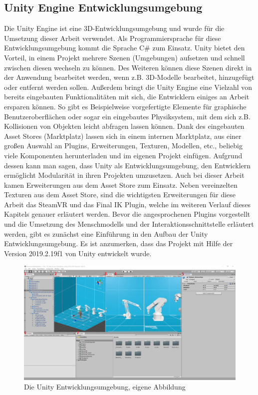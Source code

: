 \subsection{Unity Engine Entwicklungsumgebung}\label{sec:UnitEngine}
Die Unity Engine ist eine 3D-Entwicklungsumgebung und wurde für die Umsetzung dieser Arbeit verwendet. Als Programmiersprache für diese Entwicklungsumgebung kommt die Sprache C\# zum Einsatz. Unity bietet den Vorteil, in einem Projekt mehrere Szenen (Umgebungen) aufsetzen und schnell zwischen diesen wechseln zu können. Des Weiteren können diese Szenen direkt in der Anwendung bearbeitet werden, wenn z.B. 3D-Modelle bearbeitet, hinzugefügt oder entfernt werden sollen. Außerdem bringt die Unity Engine eine Vielzahl von bereits eingebauten Funktionalitäten mit sich, die Entwicklern einiges an Arbeit ersparen können. So gibt es Beispielweise vorgefertigte Elemente für graphische Benutzeroberflächen oder sogar ein eingebautes Physiksystem, mit dem sich z.B. Kollisionen von Objekten leicht abfragen lassen können. Dank des eingebauten Asset Stores (Marktplatz) lassen sich in einem internen Marktplatz, aus einer großen Auswahl an Plugins, Erweiterungen, Texturen, Modellen, etc., beliebig viele Komponenten herunterladen und im eigenen Projekt einfügen. Aufgrund dessen kann man sagen, dass Unity als Entwicklungsumgebung, den Entwicklern ermöglicht Modularität in ihren Projekten umzusetzen.
Auch bei dieser Arbeit kamen Erweiterungen aus dem Asset Store zum Einsatz. Neben vereinzelten Texturen aus dem Asset Store, sind die wichtigsten Erweiterungen für diese Arbeit das SteamVR und das Final IK Plugin, welche im weiteren Verlauf dieses Kapitels genauer erläutert werden.
\newline\newline
Bevor die angesprochenen Plugins vorgestellt und die Umsetzung des Menschmodells und der Interaktionsschnittstelle erläutert werden, gibt es zunächst eine Einführung in den Aufbau der Unity Entwicklungsumgebung. Es ist anzumerken, dass das Projekt mit Hilfe der Version 2019.2.19f1 von Unity entwickelt wurde.
\begin{figure}[h]
	\centering
	\includegraphics[width=1\linewidth]{Bilder/A47_UnityOverview2}
	\caption{Die Unity Entwicklungsumgebung, eigene Abbildung}
	\label{fig:UnityOverview}
\end{figure}
